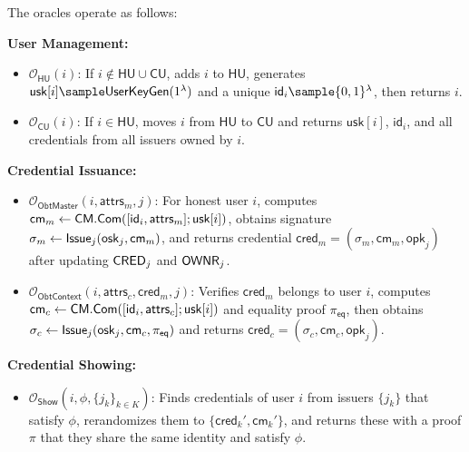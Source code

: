 \noindent The oracles operate as follows:

\noindent \textbf{User Management:}
\begin{itemize}
    \item $\mathcal{O}_{\mathsf{HU}}(i)$: If $i \notin \mathsf{HU} \cup \mathsf{CU}$, adds $i$ to $\mathsf{HU}$, generates $\mathsf{usk}[i] \sample \UserKeyGen(1^\lambda)$ and a unique $\mathsf{id}_i \sample \{0,1\}^\lambda$, then returns $i$.
    
    \item $\mathcal{O}_{\mathsf{CU}}(i)$: If $i \in \mathsf{HU}$, moves $i$ from $\mathsf{HU}$ to $\mathsf{CU}$ and returns $\mathsf{usk}[i]$, $\mathsf{id}_i$, and all credentials from all issuers owned by $i$.
\end{itemize}

\noindent \textbf{Credential Issuance:}
\begin{itemize}
    \item $\mathcal{O}_{\mathsf{ObtMaster}}(i, \mathsf{attrs}_m, j)$: For honest user $i$, computes $\mathsf{cm}_m \gets \mathsf{CM.Com}([\mathsf{id}_i, \mathsf{attrs}_m]; \mathsf{usk}[i])$, obtains signature $\sigma_m \gets \mathsf{Issue}_j(\mathsf{osk}_j, \mathsf{cm}_m)$, and returns credential $\mathsf{cred}_m = (\sigma_m, \mathsf{cm}_m, \mathsf{opk}_j)$ after updating $\mathsf{CRED}_j$ and $\mathsf{OWNR}_j$.
    
    \item $\mathcal{O}_{\mathsf{ObtContext}}(i, \mathsf{attrs}_c, \mathsf{cred}_m, j)$: Verifies $\mathsf{cred}_m$ belongs to user $i$, computes $\mathsf{cm}_c \gets \mathsf{CM.Com}([\mathsf{id}_i, \mathsf{attrs}_c]; \mathsf{usk}[i])$ and equality proof $\pi_{\mathsf{eq}}$, then obtains $\sigma_c \gets \mathsf{Issue}_j(\mathsf{osk}_j, \mathsf{cm}_c, \pi_{\mathsf{eq}})$ and returns $\mathsf{cred}_c = (\sigma_c, \mathsf{cm}_c, \mathsf{opk}_j)$.
\end{itemize}

\noindent \textbf{Credential Showing:}
\begin{itemize}
    \item $\mathcal{O}_{\mathsf{Show}}(i, \phi, \{j_k\}_{k \in K})$: Finds credentials of user $i$ from issuers $\{j_k\}$ that satisfy $\phi$, rerandomizes them to $\{\mathsf{cred}_k', \mathsf{cm}_k'\}$, and returns these with a proof $\pi$ that they share the same identity and satisfy $\phi$.
\end{itemize}










